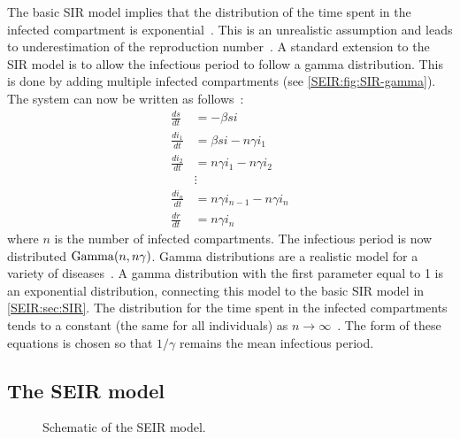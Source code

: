\documentclass[thesis.tex]{subfiles}
\begin{document}
The basic SIR model implies that the distribution of the time spent in the infected compartment is exponential~\autocite[96]{keelingModeling}.
This is an unrealistic assumption and leads to underestimation of the reproduction number~\autocites{lloydRealistic}{wearingAppropriate}.
A standard extension to the SIR model is to allow the infectious period to follow a gamma distribution.
This is done by adding multiple infected compartments (see \cref{SEIR:fig:SIR-gamma}).
The system can now be written as follows~\autocite[94]{keelingModeling}:
\begin{align}
\frac{ds}{dt} &= -\beta si \\
\frac{di_1}{dt} &= \beta si - n\gamma i_1 \\
\frac{di_2}{dt} &= n\gamma i_1 - n \gamma i_2 \\
&\vdots \nonumber \\
\frac{di_n}{dt} &= n\gamma i_{n-1} - n \gamma i_n \\
\frac{dr}{dt} &= n\gamma i_n
\end{align}
where $n$ is the number of infected compartments.
The infectious period is now distributed $\operatorname{Gamma}(n, n\gamma)$.
Gamma distributions are a realistic model for a variety of diseases~\autocite{wearingAppropriate}.
A gamma distribution with the first parameter equal to 1 is an exponential distribution, connecting this model to the basic SIR model in \cref{SEIR:sec:SIR}.
The distribution for the time spent in the infected compartments tends to a constant (\ie the same for all individuals) as $n \to \infty$~\autocite{lloydRealistic}.
The form of these equations is chosen so that $1/\gamma$ remains the mean infectious period.

\subsection{The SEIR model}
\begin{figure}[h]
  \caption[The SEIR model]{Schematic of the SEIR model.}
  \label{SEIR:fig:SEIR}
\end{figure}
\end{document}
